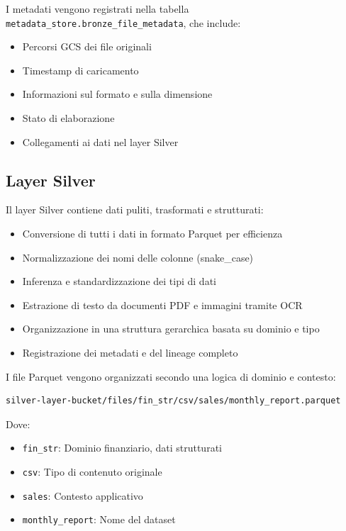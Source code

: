 \documentclass[11pt,a4paper,twoside]{report}
\begin{document}
I metadati vengono registrati nella tabella \texttt{metadata\_store.bronze\_file\_metadata}, che include:
\begin{itemize}
    \item Percorsi GCS dei file originali
    \item Timestamp di caricamento
    \item Informazioni sul formato e sulla dimensione
    \item Stato di elaborazione
    \item Collegamenti ai dati nel layer Silver
\end{itemize}

\subsection{Layer Silver}
Il layer Silver contiene dati puliti, trasformati e strutturati:
\begin{itemize}
    \item Conversione di tutti i dati in formato Parquet per efficienza
    \item Normalizzazione dei nomi delle colonne (snake\_case)
    \item Inferenza e standardizzazione dei tipi di dati
    \item Estrazione di testo da documenti PDF e immagini tramite OCR
    \item Organizzazione in una struttura gerarchica basata su dominio e tipo
    \item Registrazione dei metadati e del lineage completo
\end{itemize}

I file Parquet vengono organizzati secondo una logica di dominio e contesto:
\begin{verbatim}
silver-layer-bucket/files/fin_str/csv/sales/monthly_report.parquet
\end{verbatim}

Dove:
\begin{itemize}
    \item \texttt{fin\_str}: Dominio finanziario, dati strutturati
    \item \texttt{csv}: Tipo di contenuto originale
    \item \texttt{sales}: Contesto applicativo
    \item \texttt{monthly\_report}: Nome del dataset
\end{itemize}
\end{document}

